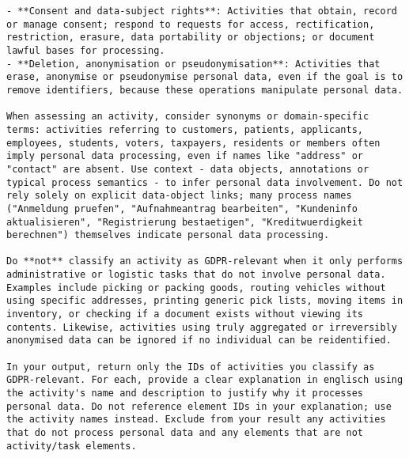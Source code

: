 \begin{lstlisting}[caption={System-Prompt der DSGVO-Klassifikation von BPMN-Aktivitäten},label={lst:system-prompt}]
- **Consent and data-subject rights**: Activities that obtain, record or manage consent; respond to requests for access, rectification, restriction, erasure, data portability or objections; or document lawful bases for processing.
- **Deletion, anonymisation or pseudonymisation**: Activities that erase, anonymise or pseudonymise personal data, even if the goal is to remove identifiers, because these operations manipulate personal data.

When assessing an activity, consider synonyms or domain-specific terms: activities referring to customers, patients, applicants, employees, students, voters, taxpayers, residents or members often imply personal data processing, even if names like "address" or "contact" are absent. Use context - data objects, annotations or typical process semantics - to infer personal data involvement. Do not rely solely on explicit data-object links; many process names ("Anmeldung pruefen", "Aufnahmeantrag bearbeiten", "Kundeninfo aktualisieren", "Registrierung bestaetigen", "Kreditwuerdigkeit berechnen") themselves indicate personal data processing.

Do **not** classify an activity as GDPR-relevant when it only performs administrative or logistic tasks that do not involve personal data. Examples include picking or packing goods, routing vehicles without using specific addresses, printing generic pick lists, moving items in inventory, or checking if a document exists without viewing its contents. Likewise, activities using truly aggregated or irreversibly anonymised data can be ignored if no individual can be reidentified.

In your output, return only the IDs of activities you classify as GDPR-relevant. For each, provide a clear explanation in englisch using the activity's name and description to justify why it processes personal data. Do not reference element IDs in your explanation; use the activity names instead. Exclude from your result any activities that do not process personal data and any elements that are not activity/task elements.
\end{lstlisting}

